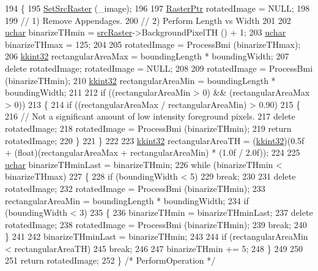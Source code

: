 \begin{DoxyCode}
194 \{
195   \hyperlink{class_k_k_b_1_1_morph_op_a07c75e151d9b95ca13da3bfc2e48dba4}{SetSrcRaster} (\_image);
196 
197   \hyperlink{class_k_k_b_1_1_raster}{RasterPtr}  rotatedImage = NULL;
198 
199   \textcolor{comment}{// 1) Remove Appendages.}
200   \textcolor{comment}{// 2) Perform Length vs Width}
201 
202   \hyperlink{namespace_k_k_b_ace9969169bf514f9ee6185186949cdf7}{uchar}  binarizeTHmin = \hyperlink{class_k_k_b_1_1_morph_op_a9af0ebff0135d124c7d1d17e21c4d7e6}{srcRaster}->BackgroundPixelTH () + 1;
203   \hyperlink{namespace_k_k_b_ace9969169bf514f9ee6185186949cdf7}{uchar}  binarizeTHmax = 125;
204 
205   rotatedImage = ProcessBmi (binarizeTHmax);
206   \hyperlink{namespace_k_k_b_a8fa4952cc84fda1de4bec1fbdd8d5b1b}{kkint32}    rectangularAreaMax = boundingLength * boundingWidth;
207   \textcolor{keyword}{delete}  rotatedImage;  rotatedImage = NULL;
208 
209   rotatedImage = ProcessBmi (binarizeTHmin);
210   \hyperlink{namespace_k_k_b_a8fa4952cc84fda1de4bec1fbdd8d5b1b}{kkint32}    rectangularAreaMin = boundingLength * boundingWidth;
211 
212   \textcolor{keywordflow}{if}  ((rectangularAreaMin > 0)  &&  (rectangularAreaMax > 0))
213   \{
214     \textcolor{keywordflow}{if}  ((rectangularAreaMax / rectangularAreaMin) > 0.90)
215     \{
216       \textcolor{comment}{// Not a significant amount of low intensity foreground pixels.}
217       \textcolor{keyword}{delete}  rotatedImage;
218       rotatedImage = ProcessBmi (binarizeTHmin);
219       \textcolor{keywordflow}{return}  rotatedImage;
220     \}
221   \}
222 
223   \hyperlink{namespace_k_k_b_a8fa4952cc84fda1de4bec1fbdd8d5b1b}{kkint32}  rectangularAreaTH = (\hyperlink{namespace_k_k_b_a8fa4952cc84fda1de4bec1fbdd8d5b1b}{kkint32})(0.5f + (\textcolor{keywordtype}{float})(rectangularAreaMax + 
      rectangularAreaMin) * (1.0f / 2.0f));
224 
225   \hyperlink{namespace_k_k_b_ace9969169bf514f9ee6185186949cdf7}{uchar}  binarizeTHminLast = binarizeTHmin;
226   \textcolor{keywordflow}{while}  (binarizeTHmin < binarizeTHmax)
227   \{
228     \textcolor{keywordflow}{if}  (boundingWidth < 5)
229       \textcolor{keywordflow}{break};
230 
231     \textcolor{keyword}{delete}  rotatedImage;
232     rotatedImage = ProcessBmi (binarizeTHmin);
233     rectangularAreaMin = boundingLength * boundingWidth;
234     \textcolor{keywordflow}{if}  (boundingWidth < 3)
235     \{
236       binarizeTHmin = binarizeTHminLast;
237       \textcolor{keyword}{delete}  rotatedImage;
238       rotatedImage = ProcessBmi (binarizeTHmin);
239       \textcolor{keywordflow}{break};
240     \}
241 
242     binarizeTHminLast = binarizeTHmin;
243 
244     \textcolor{keywordflow}{if}  (rectangularAreaMin < rectangularAreaTH)
245       \textcolor{keywordflow}{break};
246 
247     binarizeTHmin += 5;
248   \}
249 
250 
251   \textcolor{keywordflow}{return}  rotatedImage;
252 \}  \textcolor{comment}{/* PerformOperation */}
\end{DoxyCode}


